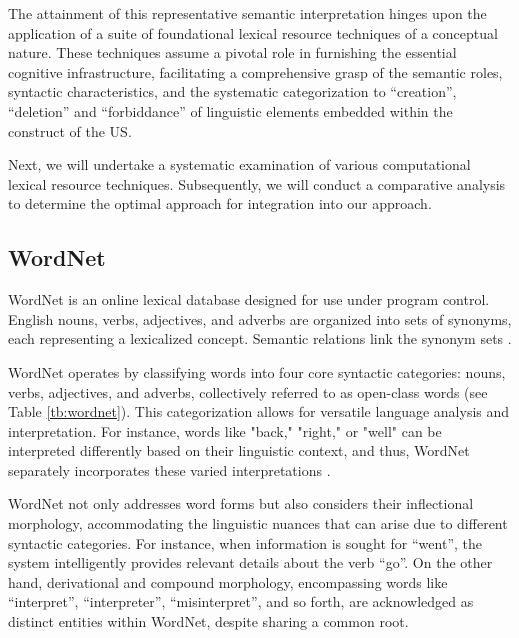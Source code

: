 The attainment of this representative semantic interpretation hinges upon the application of a suite of foundational lexical resource techniques of a conceptual nature. These techniques assume a pivotal role in furnishing the essential cognitive infrastructure, facilitating a comprehensive grasp of the semantic roles, syntactic characteristics, and the systematic categorization to \enquote{creation}, \enquote{deletion} and \enquote{forbiddance} of linguistic elements embedded within the construct of the US.

Next, we will undertake a systematic examination of various computational lexical resource techniques. Subsequently, we will conduct a comparative analysis to determine the optimal approach for integration into our approach. 
\subsection{WordNet} \label{wordnet}
WordNet is an online lexical database designed for use under program control. English nouns, verbs,
adjectives, and adverbs are organized into sets of synonyms, each representing a lexicalized concept. Semantic relations link the synonym sets \cite{miller1990introduction}. 

WordNet operates by classifying words into four core syntactic categories: nouns, verbs, adjectives, and adverbs, collectively referred to as open-class words (see Table \ref{tb:wordnet}). This categorization allows for versatile language analysis and interpretation. For instance, words like "back," "right," or "well" can be interpreted differently based on their linguistic context, and thus, WordNet separately incorporates these varied interpretations \cite{miller1995wordnet}.

WordNet not only addresses word forms but also considers their inflectional morphology, accommodating the linguistic nuances that can arise due to different syntactic categories. For instance, when information is sought for \enquote{went}, the system intelligently provides relevant details about the verb \enquote{go}. On the other hand, derivational and compound morphology, encompassing words like \enquote{interpret}, \enquote{interpreter}, \enquote{misinterpret}, and so forth, are acknowledged as distinct entities within WordNet, despite sharing a common root.

